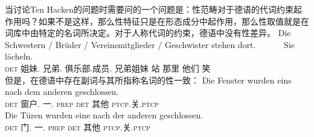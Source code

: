 当讨论Ten Hacken的问题时需要问的一个问题是：性范畴对于德语的代词约束起作用吗？如果不是这样，那么性特征只是在形态成分中起作用，那么性取值就是在词库中由特定的名词所决定。对于人称代词的约束，德语中没有性差异。
\ea
\gll Die Schwestern / Brüder / Vereinsmitglieder / Geschwister stehen dort.~~~~~~ Sie lächeln.\\
     \textsc{det} 姐妹.\fem{} {} 兄弟.\mas{} {} 俱乐部.成员.\neu{} {} 兄弟姐妹 站 那里 他们 笑\\
\z
但是，在德语中存在副词与其所指称名词的性一致\citep[\S~6]{Hoehle83}：
\eal
\label{Beispiel-einer-nach-dem-anderen}
\ex
\gll Die Fenster wurden eins nach dem anderen geschlossen.\\
	 \textsc{det} 窗户.\neu{}  \passivepst{} 一.\neu{} \textsc{prep} \textsc{det} 其他 \textsc{ptcp}.关.\textsc{ptcp}\\
\ex 
\gll Die Türen wurden eine nach der anderen geschlossen.\\
	\textsc{det} 门.\fem{} \passivepst{} 一.\fem{} \textsc{prep} \textsc{det} 其他 \textsc{ptcp}.关.\textsc{ptcp}\\
